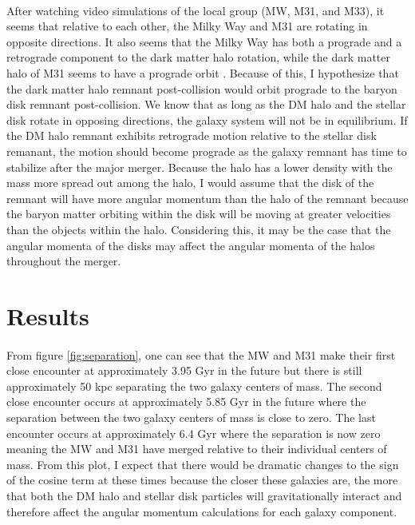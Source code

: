 \documentclass[fleqn,usenatbib]{mnras}
\begin{document}
\paragraph{} After watching video simulations of the local group (MW, M31, and M33), it seems that relative to each other, the Milky Way and M31 are rotating in opposite directions. It also seems that the Milky Way has both a prograde and a retrograde component to the dark matter halo rotation, while the dark matter halo of M31 seems to have a prograde orbit \citep{Deason+2011}. Because of this, I hypothesize that the dark matter halo remnant post-collision would orbit prograde to the baryon disk remnant post-collision. We know that as long as the DM halo and the stellar disk rotate in opposing directions, the galaxy system will not be in equilibrium. If the DM halo remnant exhibits retrograde motion relative to the stellar disk remanant, the motion should become prograde as the galaxy remnant has time to stabilize after the major merger. Because the halo has a lower density with the mass more spread out among the halo, I would assume that the disk of the remnant will have more angular momentum than the halo of the remnant because the baryon matter orbiting within the disk will be moving at greater velocities than the objects within the halo. Considering this, it may be the case that the angular momenta of the disks may affect the angular momenta of the halos throughout the merger. 


\section{Results}

\paragraph{} From figure \ref{fig:separation}, one can see that the MW and M31 make their first close encounter at approximately 3.95 Gyr in the future but there is still approximately 50 kpc separating the two galaxy centers of mass. The second close encounter occurs at approximately 5.85 Gyr in the future where the separation between the two galaxy centers of mass is close to zero. The last encounter occurs at approximately 6.4 Gyr where the separation is now zero meaning the MW and M31 have merged relative to their individual centers of mass. From this plot, I expect that there would be dramatic changes to the sign of the cosine term at these times because the closer these galaxies are, the more that both the DM halo and stellar disk particles will gravitationally interact and therefore affect the angular momentum calculations for each galaxy component. 
\end{document}
